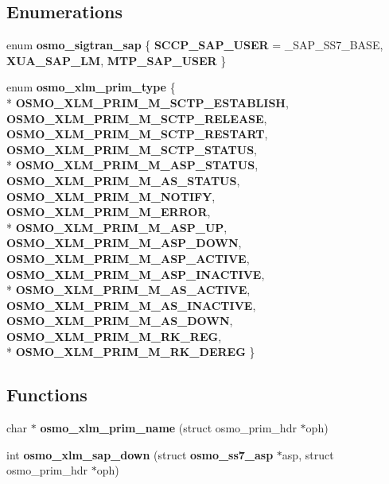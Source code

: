 \subsection*{Enumerations}
\begin{DoxyCompactItemize}
\item 
enum {\bf osmo\+\_\+sigtran\+\_\+sap} \{ {\bf S\+C\+C\+P\+\_\+\+S\+A\+P\+\_\+\+U\+S\+ER} = \+\_\+\+S\+A\+P\+\_\+\+S\+S7\+\_\+\+B\+A\+SE, 
{\bf X\+U\+A\+\_\+\+S\+A\+P\+\_\+\+LM}, 
{\bf M\+T\+P\+\_\+\+S\+A\+P\+\_\+\+U\+S\+ER}
 \}
\item 
enum {\bf osmo\+\_\+xlm\+\_\+prim\+\_\+type} \{ \\*
{\bf O\+S\+M\+O\+\_\+\+X\+L\+M\+\_\+\+P\+R\+I\+M\+\_\+\+M\+\_\+\+S\+C\+T\+P\+\_\+\+E\+S\+T\+A\+B\+L\+I\+SH}, 
{\bf O\+S\+M\+O\+\_\+\+X\+L\+M\+\_\+\+P\+R\+I\+M\+\_\+\+M\+\_\+\+S\+C\+T\+P\+\_\+\+R\+E\+L\+E\+A\+SE}, 
{\bf O\+S\+M\+O\+\_\+\+X\+L\+M\+\_\+\+P\+R\+I\+M\+\_\+\+M\+\_\+\+S\+C\+T\+P\+\_\+\+R\+E\+S\+T\+A\+RT}, 
{\bf O\+S\+M\+O\+\_\+\+X\+L\+M\+\_\+\+P\+R\+I\+M\+\_\+\+M\+\_\+\+S\+C\+T\+P\+\_\+\+S\+T\+A\+T\+US}, 
\\*
{\bf O\+S\+M\+O\+\_\+\+X\+L\+M\+\_\+\+P\+R\+I\+M\+\_\+\+M\+\_\+\+A\+S\+P\+\_\+\+S\+T\+A\+T\+US}, 
{\bf O\+S\+M\+O\+\_\+\+X\+L\+M\+\_\+\+P\+R\+I\+M\+\_\+\+M\+\_\+\+A\+S\+\_\+\+S\+T\+A\+T\+US}, 
{\bf O\+S\+M\+O\+\_\+\+X\+L\+M\+\_\+\+P\+R\+I\+M\+\_\+\+M\+\_\+\+N\+O\+T\+I\+FY}, 
{\bf O\+S\+M\+O\+\_\+\+X\+L\+M\+\_\+\+P\+R\+I\+M\+\_\+\+M\+\_\+\+E\+R\+R\+OR}, 
\\*
{\bf O\+S\+M\+O\+\_\+\+X\+L\+M\+\_\+\+P\+R\+I\+M\+\_\+\+M\+\_\+\+A\+S\+P\+\_\+\+UP}, 
{\bf O\+S\+M\+O\+\_\+\+X\+L\+M\+\_\+\+P\+R\+I\+M\+\_\+\+M\+\_\+\+A\+S\+P\+\_\+\+D\+O\+WN}, 
{\bf O\+S\+M\+O\+\_\+\+X\+L\+M\+\_\+\+P\+R\+I\+M\+\_\+\+M\+\_\+\+A\+S\+P\+\_\+\+A\+C\+T\+I\+VE}, 
{\bf O\+S\+M\+O\+\_\+\+X\+L\+M\+\_\+\+P\+R\+I\+M\+\_\+\+M\+\_\+\+A\+S\+P\+\_\+\+I\+N\+A\+C\+T\+I\+VE}, 
\\*
{\bf O\+S\+M\+O\+\_\+\+X\+L\+M\+\_\+\+P\+R\+I\+M\+\_\+\+M\+\_\+\+A\+S\+\_\+\+A\+C\+T\+I\+VE}, 
{\bf O\+S\+M\+O\+\_\+\+X\+L\+M\+\_\+\+P\+R\+I\+M\+\_\+\+M\+\_\+\+A\+S\+\_\+\+I\+N\+A\+C\+T\+I\+VE}, 
{\bf O\+S\+M\+O\+\_\+\+X\+L\+M\+\_\+\+P\+R\+I\+M\+\_\+\+M\+\_\+\+A\+S\+\_\+\+D\+O\+WN}, 
{\bf O\+S\+M\+O\+\_\+\+X\+L\+M\+\_\+\+P\+R\+I\+M\+\_\+\+M\+\_\+\+R\+K\+\_\+\+R\+EG}, 
\\*
{\bf O\+S\+M\+O\+\_\+\+X\+L\+M\+\_\+\+P\+R\+I\+M\+\_\+\+M\+\_\+\+R\+K\+\_\+\+D\+E\+R\+EG}
 \}
\end{DoxyCompactItemize}
\subsection*{Functions}
\begin{DoxyCompactItemize}
\item 
char $\ast$ {\bf osmo\+\_\+xlm\+\_\+prim\+\_\+name} (struct osmo\+\_\+prim\+\_\+hdr $\ast$oph)
\item 
int {\bf osmo\+\_\+xlm\+\_\+sap\+\_\+down} (struct {\bf osmo\+\_\+ss7\+\_\+asp} $\ast$asp, struct osmo\+\_\+prim\+\_\+hdr $\ast$oph)
\end{DoxyCompactItemize}


